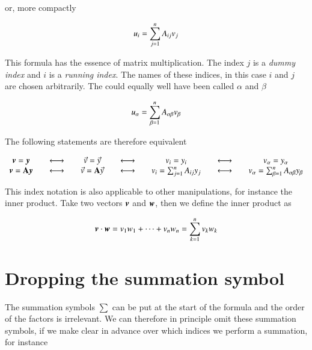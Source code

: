 or, more compactly 


\begin{equation}
u_i = \sum_{j=1}^n A_{ij} v_j \\ 
\end{equation}

This formula has the essence of matrix multiplication. The index $j$ is a
{\it dummy index} and $i$ is a {\it running index}. The names of these indices, in this case $i$ and $j$ are chosen arbitrarily. The could equally well have been called $\alpha$ and $\beta$

\begin{equation}
u_\alpha = \sum_{\beta=1}^n A_{\alpha\beta} v_\beta \\ 
\end{equation}

The following statements are therefore equivalent

\begin{equation}
\begin{array}{ccccccc}
{\boldsymbol{v}} = {\boldsymbol{y}} &\quad\longleftrightarrow\quad& \vec{v} = \vec{y} &\quad\longleftrightarrow\quad & v_i = y_i& \quad\longleftrightarrow\quad & v_\alpha = y_\alpha\\
{\boldsymbol{v}} = \boldsymbol{\mathrm{A}}{\boldsymbol{y}} & \quad\longleftrightarrow\quad & \vec{v} = \boldsymbol{\mathrm{A}}\vec{y} & \quad\longleftrightarrow\quad & v_i = \sum_{j=1}^n A_{ij}y_j & \quad\longleftrightarrow\quad & v_\alpha = \sum_{\beta=1}^n A_{\alpha\beta}y_\beta
\end{array}
\end{equation}

This index notation is also applicable to other manipulations, for instance the inner
product. Take two vectors ${\boldsymbol{v}}$ and ${\boldsymbol{w}}$, then we define the inner product as

\begin{equation}
{\boldsymbol{v}} \cdot {\boldsymbol{w}} = v_1w_1 + \dots + v_nw_n = \sum_{k=1}^n v_k w_k 
\end{equation}


\section{Dropping the summation symbol}

The summation symbols $\sum$ can be put at the start of the formula and the order of the factors is irrelevant. We can therefore in principle omit these summation symbols, if we make clear in advance over which indices we perform a summation, for instance 


